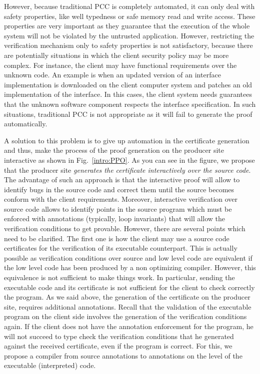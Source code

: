 However, because traditional PCC is completely automated, it can only deal with safety properties, like well typedness or safe memory read and write access.
These properties are very important as they guarantee that the execution of the whole system will not be violated by the untrusted application.
However, restricting the verification mechanism only to safety properties is not satisfactory, because there are 
potentially situations in which the client security policy may be more complex.
For instance, the client may have functional requirements over the unknown code. An example is  when an updated version  of an interface   implementation
 is downloaded on the  client computer system and patches an old implementation of the interface. In this cases, the client system needs guarantees
 that the unknown software component respects the interface specification.
In such situations, traditional PCC is not appropriate as it will fail to generate the proof automatically. 


A solution to this problem is to give up automation in the certificate generation and thus, make the process of  the proof generation 
on the producer site interactive as shown in Fig.\ \ref{intro:PPO}. As you can see in the figure, we propose that  the producer site
 \textit{generates the certificate interactively over the source code}. The advantage of 
such an approach  is that the interactive proof will allow to identify bugs in the source code and
 correct them until the source becomes conform with the client  requirements. 
Moreover,  interactive verification over source code allows to identify  points in the source program which 
must be enforced with  annotations (typically, loop invariants)
 that will allow the verification conditions to get provable. 
However, there are several points which need to be clarified.
The first one is how the client may use a source code certificates for the verification of its executable counterpart.
This is actually possible as verification conditions over source and low level code are equivalent if the low level 
code has been produced by a non optimizing compiler. However, this equivalence is not sufficient to make things work.
In particular, sending the executable code and its certificate is not sufficient for the client to check correctly the program.
 As we said above, the generation of the certificate on the producer site, requires additional annotations.
 Recall that the validation of the executable program on the client side  involves the generation of the verification
 conditions again. If the client does not have the annotation enforcement for the program, he will not succeed to type
check the verification conditions that he generated against the received certificate, even if the program is correct. 
For this, we propose a compiler from source annotations to annotations on the level of the executable (interpreted) code.



